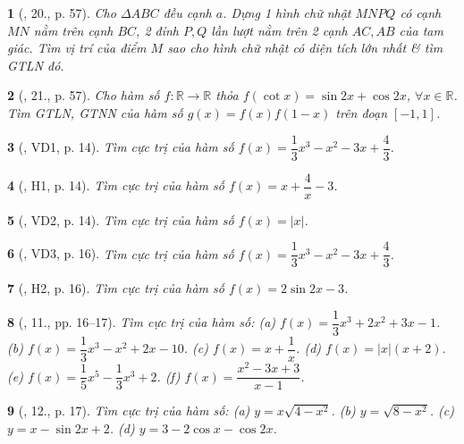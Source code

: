 \documentclass{article}
\newtheorem{baitoan}{}
\begin{document}
\begin{baitoan}[\cite{TLCT_BT_dai_so_giai_tich_11}, 20., p. 57]
	Cho $\Delta ABC$ đều cạnh $a$. Dựng 1 hình chữ nhật $MNPQ$ có cạnh $MN$ nằm trên cạnh $BC$, 2 đỉnh $P,Q$ lần lượt nằm trên 2 cạnh $AC,AB$ của tam giác. Tìm vị trí của điểm $M$ sao cho hình chữ nhật có diện tích lớn nhất \& tìm {\rm GTLN} đó.
\end{baitoan}

\begin{baitoan}[\cite{TLCT_BT_dai_so_giai_tich_11}, 21., p. 57]
	Cho hàm số $f:\mathbb{R}\to\mathbb{R}$ thỏa $f(\cot x) = \sin2x + \cos2x$, $\forall x\in\mathbb{R}$. Tìm {\rm GTLN, GTNN} của hàm số $g(x) = f(x)f(1 - x)$ trên đoạn $[-1,1]$.
\end{baitoan}

\begin{baitoan}[\cite{SGK_Toan_12_giai_tich_nang_cao}, VD1, p. 14]
	Tìm cực trị của hàm số $f(x) = \dfrac{1}{3}x^3 - x^2 - 3x + \dfrac{4}{3}$.
\end{baitoan}

\begin{baitoan}[\cite{SGK_Toan_12_giai_tich_nang_cao}, H1, p. 14]
	Tìm cực trị của hàm số $f(x) = x + \dfrac{4}{x} - 3$.
\end{baitoan}

\begin{baitoan}[\cite{SGK_Toan_12_giai_tich_nang_cao}, VD2, p. 14]
	Tìm cực trị của hàm số $f(x) = |x|$.
\end{baitoan}

\begin{baitoan}[\cite{SGK_Toan_12_giai_tich_nang_cao}, VD3, p. 16]
	Tìm cực trị của hàm số $f(x) = \dfrac{1}{3}x^3 - x^2 - 3x + \dfrac{4}{3}$.
\end{baitoan}

\begin{baitoan}[\cite{SGK_Toan_12_giai_tich_nang_cao}, H2, p. 16]
	Tìm cực trị của hàm số $f(x) = 2\sin2x - 3$.
\end{baitoan}

\begin{baitoan}[\cite{SGK_Toan_12_giai_tich_nang_cao}, 11., pp. 16--17]
	Tìm cực trị của hàm số: (a) $f(x) = \dfrac{1}{3}x^3 + 2x^2 + 3x - 1$. (b) $f(x) = \dfrac{1}{3}x^3 - x^2 + 2x - 10$. (c) $f(x) = x + \dfrac{1}{x}$. (d) $f(x) = |x|(x + 2)$. (e) $f(x) = \dfrac{1}{5}x^5 - \dfrac{1}{3}x^3 + 2$. (f) $f(x) = \dfrac{x^2 - 3x + 3}{x - 1}$.
\end{baitoan}

\begin{baitoan}[\cite{SGK_Toan_12_giai_tich_nang_cao}, 12., p. 17]
	Tìm cực trị của hàm số: (a) $y = x\sqrt{4 - x^2}$. (b) $y = \sqrt{8 - x^2}$. (c) $y = x - \sin2x + 2$. (d) $y = 3 - 2\cos x - \cos2x$.
\end{baitoan}
\end{document}
